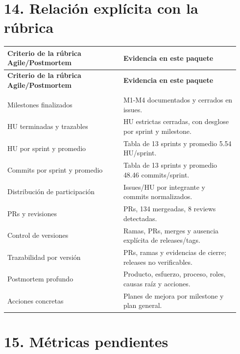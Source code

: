 \documentclass[11pt,a4paper]{article}
\begin{document}
\section{14. Relación explícita con la rúbrica}

\begingroup
\small
\setlength{\LTpre}{0.4em}
\setlength{\LTpost}{0.8em}
\begin{longtable}{>{\RaggedRight\arraybackslash}p{0.47\linewidth}>{\RaggedRight\arraybackslash}p{0.47\linewidth}}
\toprule
\textbf{Criterio de la rúbrica Agile/Postmortem} & \textbf{Evidencia en este paquete} \\
\midrule
\endfirsthead
\toprule
\textbf{Criterio de la rúbrica Agile/Postmortem} & \textbf{Evidencia en este paquete} \\
\midrule
\endhead
\midrule
\multicolumn{2}{r}{\small\textit{Continua en la siguiente pagina}} \\
\endfoot
\bottomrule
\endlastfoot
Milestones finalizados & M1-M4 documentados y cerrados en issues. \\
HU terminadas y trazables & 72 HU estrictas cerradas, con desglose por sprint y milestone. \\
HU por sprint y promedio & Tabla de 13 sprints y promedio 5.54 HU/sprint. \\
Commits por sprint y promedio & Tabla de 13 sprints y promedio 48.46 commits/sprint. \\
Distribución de participación & Issues/HU por integrante y commits normalizados. \\
PRs y revisiones & 161 PRs, 134 mergeadas, 8 reviews detectadas. \\
Control de versiones & Ramas, PRs, merges y ausencia explícita de releases/tags. \\
Trazabilidad por versión & PRs, ramas y evidencias de cierre; releases no verificables. \\
Postmortem profundo & Producto, esfuerzo, proceso, roles, causas raíz y acciones. \\
Acciones concretas & Planes de mejora por milestone y plan general. \\
\end{longtable}
\endgroup

\section{15. Métricas pendientes}
\end{document}
